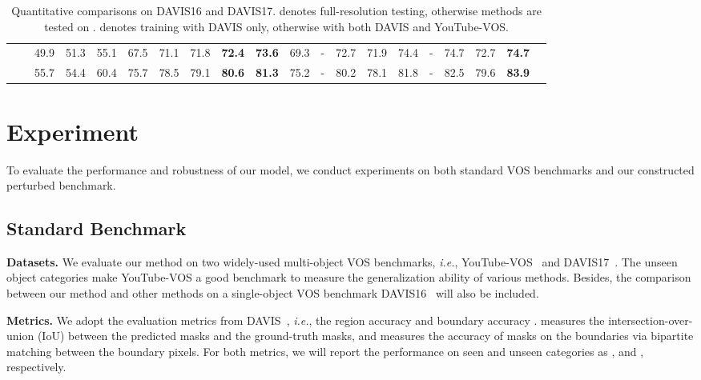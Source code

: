 \documentclass[sigconf]{acmart}
\begin{document}
\begin{table*}
\begin{small}
{\begin{tabular}{c|c||ccccccc|c||cccccccccc}
        & &49.9&51.3&55.1&67.5& 71.1 &71.8& \textbf{{72.4}}&\textbf{{73.6}} &69.3     & - & 72.7  & 71.9 & 74.4 & - &{74.7}&72.7& \textbf{74.7} \\ 
        &  &55.7&54.4&60.4&75.7& 78.5 &79.1& \textbf{{80.6}}&\textbf{{81.3}} &75.2   & - & 80.2  & 78.1 & 81.8 & - &82.5&79.6& \textbf{83.9}\\        
        \bottomrule
    \end{tabular}
    }\end{small}
\caption{Quantitative comparisons on DAVIS16\cite{perazzi2016benchmark} and DAVIS17\cite{pont20172017}.  denotes full-resolution testing, otherwise methods are tested on .  denotes training with DAVIS only, otherwise with both DAVIS and YouTube-VOS.}
    \label{table:dv}
\end{table*}
  \section{Experiment}\label{sec:Experiment}
To evaluate the performance and robustness of our model, we conduct experiments on both standard VOS benchmarks and our constructed perturbed benchmark.
\subsection{Standard Benchmark}
\noindent\textbf{Datasets.}
We evaluate our method on two widely-used multi-object VOS benchmarks, 
    \textit{i.e.},
    YouTube-VOS~\cite{xu2018youtube} and DAVIS17~\cite{pont20172017}. The unseen object categories make YouTube-VOS a good benchmark to 
    measure the generalization ability of various methods.
Besides,
    the comparison between our method and other methods on a single-object VOS benchmark DAVIS16~\cite{perazzi2016benchmark} will also be included.

\noindent\textbf{Metrics.} 
We adopt the evaluation metrics from DAVIS~\cite{perazzi2016benchmark},
    \textit{i.e.},
    the region accuracy  and boundary accuracy .  measures the intersection-over-union (IoU) between the predicted masks and the ground-truth masks, 
    and  measures the accuracy of masks on the boundaries via bipartite matching between the boundary pixels. 
For both metrics,  we will report the performance on seen and unseen categories as ,  and ,  respectively.
\end{document}
